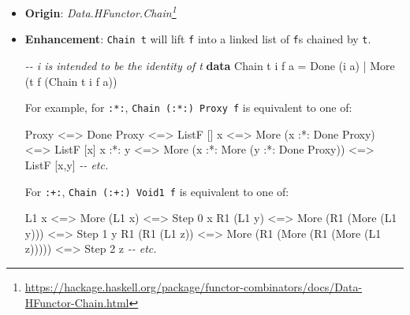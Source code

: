 \documentclass[]{article}
\newenvironment{Shaded}{}{}
\newcommand{\CommentTok}[1]{\textcolor[rgb]{0.38,0.63,0.69}{\textit{#1}}}
\newcommand{\DataTypeTok}[1]{\textcolor[rgb]{0.56,0.13,0.00}{#1}}
\newcommand{\DecValTok}[1]{\textcolor[rgb]{0.25,0.63,0.44}{#1}}
\newcommand{\KeywordTok}[1]{\textcolor[rgb]{0.00,0.44,0.13}{\textbf{#1}}}
\newcommand{\NormalTok}[1]{#1}
\newcommand{\OperatorTok}[1]{\textcolor[rgb]{0.40,0.40,0.40}{#1}}
\newcommand{\OtherTok}[1]{\textcolor[rgb]{0.00,0.44,0.13}{#1}}
\renewcommand{\href}[2]{#2\footnote{\url{#1}}}
\begin{document}
\begin{itemize}
\item
  \textbf{Origin}:
  \emph{\href{https://hackage.haskell.org/package/functor-combinators/docs/Data-HFunctor-Chain.html}{Data.HFunctor.Chain}}
\item
  \textbf{Enhancement}: \texttt{Chain\ t} will lift \texttt{f} into a linked
  list of \texttt{f}s chained by \texttt{t}.

\begin{Shaded}
\begin{Highlighting}[]
\CommentTok{{-}{-} i is intended to be the identity of t}
\KeywordTok{data} \DataTypeTok{Chain}\NormalTok{ t i f a }\OtherTok{=} \DataTypeTok{Done}\NormalTok{ (i a)}
                   \OperatorTok{|} \DataTypeTok{More}\NormalTok{ (t f (}\DataTypeTok{Chain}\NormalTok{ t i f a))}
\end{Highlighting}
\end{Shaded}

  For example, for \texttt{:*:}, \texttt{Chain\ (:*:)\ Proxy\ f} is equivalent
  to one of:

\begin{Shaded}
\begin{Highlighting}[]
\DataTypeTok{Proxy}   \OperatorTok{<=>} \DataTypeTok{Done} \DataTypeTok{Proxy}                           \OperatorTok{<=>} \DataTypeTok{ListF}\NormalTok{ []}
\NormalTok{x       }\OperatorTok{<=>} \DataTypeTok{More}\NormalTok{ (x }\OperatorTok{:*:} \DataTypeTok{Done} \DataTypeTok{Proxy}\NormalTok{)              }\OperatorTok{<=>} \DataTypeTok{ListF}\NormalTok{ [x]}
\NormalTok{x }\OperatorTok{:*:}\NormalTok{ y }\OperatorTok{<=>} \DataTypeTok{More}\NormalTok{ (x }\OperatorTok{:*:} \DataTypeTok{More}\NormalTok{ (y }\OperatorTok{:*:} \DataTypeTok{Done} \DataTypeTok{Proxy}\NormalTok{)) }\OperatorTok{<=>} \DataTypeTok{ListF}\NormalTok{ [x,y]}
\CommentTok{{-}{-} etc.}
\end{Highlighting}
\end{Shaded}

  For \texttt{:+:}, \texttt{Chain\ (:+:)\ Void1\ f} is equivalent to one of:

\begin{Shaded}
\begin{Highlighting}[]
\DataTypeTok{L1}\NormalTok{ x           }\OperatorTok{<=>} \DataTypeTok{More}\NormalTok{ (}\DataTypeTok{L1}\NormalTok{ x)                         }\OperatorTok{<=>} \DataTypeTok{Step} \DecValTok{0}\NormalTok{ x}
\DataTypeTok{R1}\NormalTok{ (}\DataTypeTok{L1}\NormalTok{ y)      }\OperatorTok{<=>} \DataTypeTok{More}\NormalTok{ (}\DataTypeTok{R1}\NormalTok{ (}\DataTypeTok{More}\NormalTok{ (}\DataTypeTok{L1}\NormalTok{ y)))             }\OperatorTok{<=>} \DataTypeTok{Step} \DecValTok{1}\NormalTok{ y}
\DataTypeTok{R1}\NormalTok{ (}\DataTypeTok{R1}\NormalTok{ (}\DataTypeTok{L1}\NormalTok{ z)) }\OperatorTok{<=>} \DataTypeTok{More}\NormalTok{ (}\DataTypeTok{R1}\NormalTok{ (}\DataTypeTok{More}\NormalTok{ (}\DataTypeTok{R1}\NormalTok{ (}\DataTypeTok{More}\NormalTok{ (}\DataTypeTok{L1}\NormalTok{ z))))) }\OperatorTok{<=>} \DataTypeTok{Step} \DecValTok{2}\NormalTok{ z}
\CommentTok{{-}{-} etc.}
\end{Highlighting}
\end{Shaded}


\end{itemize}
\end{document}
